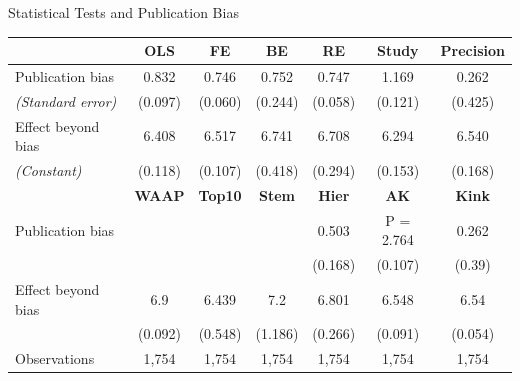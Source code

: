 \documentclass{beamer} %
\begin{document}
\begin{frame}{Statistical Tests and Publication Bias}
    \begin{tiny}

        \begin{table}[!t]
            \centering
            \begin{tabular}{
                @{}l*{6}{c}
                } %
                \toprule
                \multicolumn{1}{l}{}                  &
                \multicolumn{1}{c}{\textbf{OLS}}      &
                \multicolumn{1}{c}{\textbf{FE}}       &
                \multicolumn{1}{c}{\textbf{BE}}       &
                \multicolumn{1}{c}{\textbf{RE}}       &
                \multicolumn{1}{c}{\textbf{Study}}    &
                \multicolumn{1}{c}{\textbf{Precision}}                                                              \\
                \midrule
                Publication bias                      & 0.832   & 0.746   & 0.752   & 0.747   & 1.169     & 0.262   \\
                \emph{\hspace{0.2cm}(Standard error)} & (0.097) & (0.060) & (0.244) & (0.058) & (0.121)   & (0.425) \\
                \addlinespace[0.5em]
                Effect beyond bias                    & 6.408   & 6.517   & 6.741   & 6.708   & 6.294     & 6.540   \\
                \emph{\hspace{0.2cm}(Constant)}       & (0.118) & (0.107) & (0.418) & (0.294) & (0.153)   & (0.168) \\
                \addlinespace[0.5em]
                \toprule
                \addlinespace[0.5em]
                \multicolumn{1}{c}{}                  &
                \multicolumn{1}{c}{\textbf{WAAP}}     &
                \multicolumn{1}{c}{\textbf{Top10}}    &
                \multicolumn{1}{c}{\textbf{Stem}}     &
                \multicolumn{1}{c}{\textbf{Hier}}     &
                \multicolumn{1}{c}{\textbf{AK}}       &
                \multicolumn{1}{c}{\textbf{Kink}}                                                                   \\
                \midrule
                Publication bias                      &         &         &         & 0.503   & P = 2.764 & 0.262   \\
                                                      &         &         &         & (0.168) & (0.107)   & (0.39)  \\
                \addlinespace[0.5em]
                Effect beyond bias                    & 6.9     & 6.439   & 7.2     & 6.801   & 6.548     & 6.54    \\
                                                      & (0.092) & (0.548) & (1.186) & (0.266) & (0.091)   & (0.054) \\
                \addlinespace[0.5em]
                \midrule
                Observations                          & 1,754   & 1,754   & 1,754   & 1,754   & 1,754     & 1,754   \\


\end{tabular}
\end{table}
\end{tiny}
\end{frame}
\end{document}

